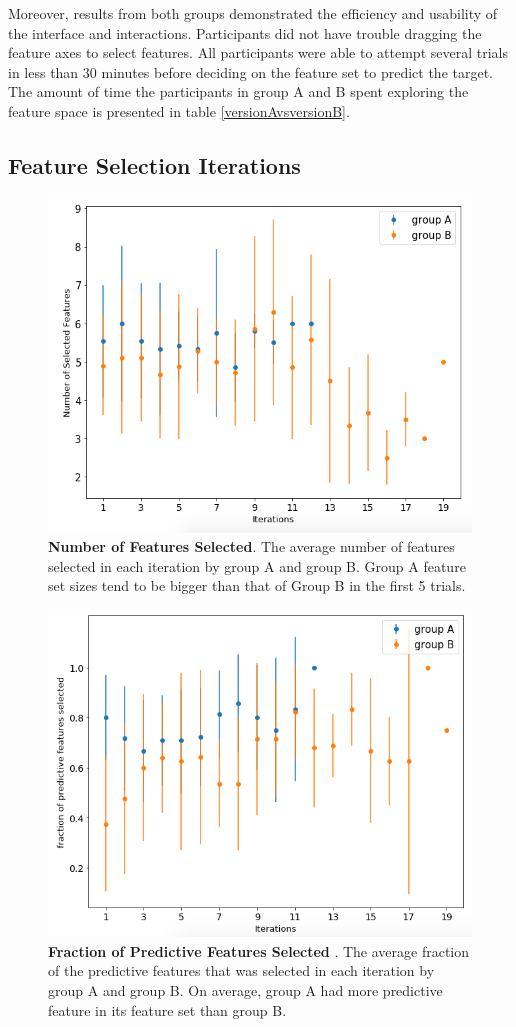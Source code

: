 Moreover, results from both groups demonstrated the efficiency and usability of the interface and interactions. Participants did not have trouble dragging the feature axes to select features. All participants were able to attempt several trials in less than 30 minutes before deciding on the feature set to predict the target. The amount of time the participants in group A and B spent exploring the feature space is presented in table \ref{versionAvsversionB}.

\subsection { Feature Selection Iterations }
\begin{figure}
    \centering
    \includegraphics[width=.75\textwidth]{numberofselected}
    \caption{\textbf{Number of Features Selected}. The average number of features selected in each iteration by group A and group B. Group A feature set sizes tend to be bigger than that of Group B in the first 5 trials.  }
    \label{fig:numberofselected}
\end{figure}

\begin{figure}
    \centering
    \includegraphics[width=.75\textwidth]{predictivefeaturesselected}
    \caption{\textbf{Fraction of Predictive Features Selected }. The average fraction of the predictive features that was selected in each iteration by group A and group B. On average, group A had more predictive feature in its feature set than group B. }
    \label{fig:predictivefeaturesselected}
\end{figure}

